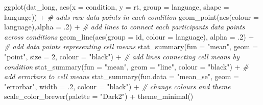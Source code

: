 \documentclass[
  english,
  doc,floatsintext]{apa6}
\newenvironment{Shaded}{\begin{snugshade}}{\end{snugshade}}
\newcommand{\AttributeTok}[1]{\textcolor[rgb]{0.77,0.63,0.00}{#1}}
\newcommand{\CommentTok}[1]{\textcolor[rgb]{0.56,0.35,0.01}{\textit{#1}}}
\newcommand{\DecValTok}[1]{\textcolor[rgb]{0.00,0.00,0.81}{#1}}
\newcommand{\FunctionTok}[1]{\textcolor[rgb]{0.00,0.00,0.00}{#1}}
\newcommand{\NormalTok}[1]{#1}
\newcommand{\SpecialCharTok}[1]{\textcolor[rgb]{0.00,0.00,0.00}{#1}}
\newcommand{\StringTok}[1]{\textcolor[rgb]{0.31,0.60,0.02}{#1}}
\begin{document}
\begin{Shaded}
\begin{Highlighting}[]
\FunctionTok{ggplot}\NormalTok{(dat\_long, }\FunctionTok{aes}\NormalTok{(}\AttributeTok{x =}\NormalTok{ condition, }\AttributeTok{y =}\NormalTok{ rt, }
                     \AttributeTok{group =}\NormalTok{ language, }\AttributeTok{shape =}\NormalTok{ language)) }\SpecialCharTok{+}
  \CommentTok{\# adds raw data points in each condition}
  \FunctionTok{geom\_point}\NormalTok{(}\FunctionTok{aes}\NormalTok{(}\AttributeTok{colour =}\NormalTok{ language),}\AttributeTok{alpha =}\NormalTok{ .}\DecValTok{2}\NormalTok{) }\SpecialCharTok{+}
  \CommentTok{\# add lines to connect each participant\textquotesingle{}s data points across conditions}
  \FunctionTok{geom\_line}\NormalTok{(}\FunctionTok{aes}\NormalTok{(}\AttributeTok{group =}\NormalTok{ id, }\AttributeTok{colour =}\NormalTok{ language), }\AttributeTok{alpha =}\NormalTok{ .}\DecValTok{2}\NormalTok{) }\SpecialCharTok{+}
  \CommentTok{\# add data points representing cell means}
  \FunctionTok{stat\_summary}\NormalTok{(}\AttributeTok{fun =} \StringTok{"mean"}\NormalTok{, }\AttributeTok{geom =} \StringTok{"point"}\NormalTok{, }\AttributeTok{size =} \DecValTok{2}\NormalTok{, }\AttributeTok{colour =} \StringTok{"black"}\NormalTok{) }\SpecialCharTok{+}
  \CommentTok{\# add lines connecting cell means by condition}
  \FunctionTok{stat\_summary}\NormalTok{(}\AttributeTok{fun =} \StringTok{"mean"}\NormalTok{, }\AttributeTok{geom =} \StringTok{"line"}\NormalTok{, }\AttributeTok{colour =} \StringTok{"black"}\NormalTok{) }\SpecialCharTok{+}
  \CommentTok{\# add errorbars to cell means}
  \FunctionTok{stat\_summary}\NormalTok{(}\AttributeTok{fun.data =} \StringTok{"mean\_se"}\NormalTok{, }\AttributeTok{geom =} \StringTok{"errorbar"}\NormalTok{, }
               \AttributeTok{width =}\NormalTok{ .}\DecValTok{2}\NormalTok{, }\AttributeTok{colour =} \StringTok{"black"}\NormalTok{) }\SpecialCharTok{+}
  \CommentTok{\# change colours and theme}
  \FunctionTok{scale\_color\_brewer}\NormalTok{(}\AttributeTok{palette =} \StringTok{"Dark2"}\NormalTok{) }\SpecialCharTok{+}
  \FunctionTok{theme\_minimal}\NormalTok{()}
\end{Highlighting}
\end{Shaded}
\end{document}
